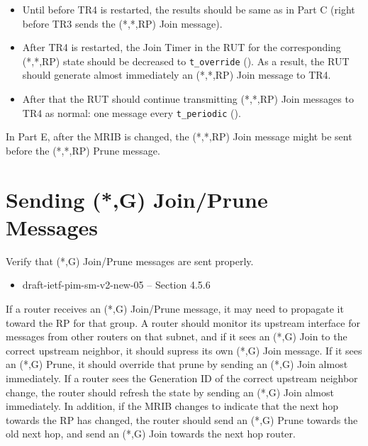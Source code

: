 \documentclass[11pt]{report}
\begin{document}

\begin{itemize}

  \item Until before TR4 is restarted, the results should
  be same as in Part C (right before TR3 sends the (*,*,RP) Join message).

  \item After TR4 is restarted,
  the Join Timer in the RUT for the corresponding (*,*,RP) state
  should be decreased to \verb=t_override= ({\PimsmTOverride}). As a result,
  the RUT should generate almost immediately an (*,*,RP) Join message to TR4.

  \item After that the RUT should continue transmitting 
  (*,*,RP) Join messages to TR4 as normal: one message every \verb=t_periodic=
  ({\PimsmTPeriodic}).

\end{itemize}


In Part E, after the MRIB is changed, the (*,*,RP) Join message might
be sent before the (*,*,RP) Prune message.

\newpage
\section{Sending (*,G) Join/Prune Messages}

Verify that (*,G) Join/Prune messages are sent properly.

\begin{itemize}
  \item draft-ietf-pim-sm-v2-new-05 -- Section 4.5.6
\end{itemize}

If a router receives an (*,G) Join/Prune message, it may need to propagate
it toward the RP for that group. A router should monitor its upstream
interface for messages
from other routers on that subnet, and if it sees an (*,G) Join to the
correct upstream neighbor, it should supress its own (*,G) Join message.
If it sees an (*,G) Prune, it should override that prune by sending an
(*,G) Join almost immediately. If a router sees the Generation ID of the
correct upstream neighbor change, the router should refresh the state by
sending an (*,G) Join almost immediately. In addition, if the MRIB changes
to indicate that the next hop towards the RP has changed, the router should
send an (*,G) Prune towards the old next hop, and send an (*,G) Join
towards the next hop router.
\end{document}

